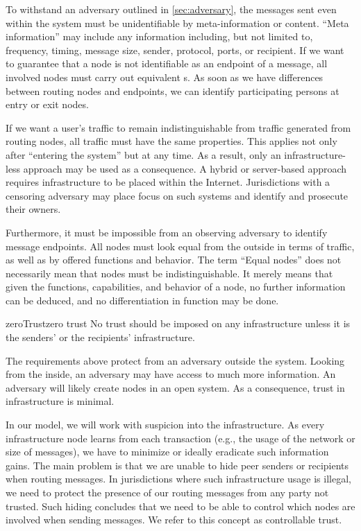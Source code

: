 To withstand an adversary outlined in \cref{sec:adversary}, the messages sent even within the system must be unidentifiable by meta-information or content. ``Meta information'' may include any information including, but not limited to, frequency, timing, message size, sender, protocol, ports, or recipient. If we want to guarantee that a node is not identifiable as an endpoint of a message, all involved nodes must carry out equivalent s. As soon as we have differences between routing nodes and endpoints, we can identify participating persons at entry or exit nodes.

If we want a user's traffic to remain indistinguishable from traffic generated from routing nodes, all traffic must have the same properties. This applies not only after ``entering the system'' but at any time. As a result, only an infrastructure-less approach may be used as a consequence. A hybrid or server-based approach requires infrastructure to be placed within the Internet. Jurisdictions with a censoring adversary may place focus on such systems and identify and prosecute their owners. 

Furthermore, it must be impossible from an observing adversary to identify message endpoints. All nodes must look equal from the outside in terms of traffic, as well as by offered functions and behavior. The term ``Equal nodes'' does not necessarily mean that nodes must be indistinguishable. It merely means that given the functions, capabilities, and behavior of a node, no further information can be deduced, and no differentiation in function may be done.

\begin{requirement}{zeroTrust}{zero trust}
	No trust should be imposed on any infrastructure unless it is the senders' or the recipients' infrastructure.
\end{requirement}    

The requirements above protect from an adversary outside the system. Looking from the inside, an adversary may have access to much more information. An adversary will likely create nodes in an open system. As a consequence, trust in infrastructure is minimal.

In our model, we will work with suspicion into the infrastructure. As every infrastructure node learns from each transaction (e.g., the usage of the network or size of messages), we have to minimize or ideally eradicate such information gains. The main problem is that we are unable to hide peer senders or recipients when routing messages. In jurisdictions where such infrastructure usage is illegal, we need to protect the presence of our routing messages from any party not trusted. Such hiding concludes that we need to be able to control which nodes are involved when sending messages. We refer to this concept as controllable trust.

